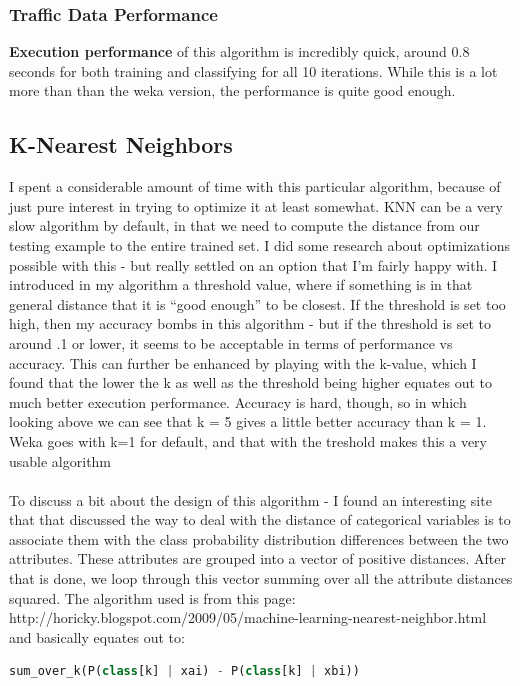 \documentclass{article}
\begin{document}
\subsubsection{Traffic Data Performance}
\textbf{Execution performance} of this algorithm is incredibly quick, around 0.8 seconds for both training and classifying for all 10 iterations.  While this is a lot more than than the weka version, the performance is quite good enough.\\
\subsection{K-Nearest Neighbors}
I spent a considerable amount of time with this particular algorithm, because of just pure interest in trying to optimize it at least somewhat.  KNN can be a very slow algorithm by default, in that we need to compute the distance from our testing example to the entire trained set.  I did some research about optimizations possible with this - but really settled on an option that I'm fairly happy with.  I introduced in my algorithm a threshold value, where if something is in that general distance that it is ``good enough'' to be closest.  If the threshold is set too high, then my accuracy bombs in this algorithm - but if the threshold is set to around .1 or lower, it seems to be acceptable in terms of performance vs accuracy.  This can further be enhanced by playing with the k-value, which I found that the lower the k as well as the threshold being higher equates out to much better execution performance.  Accuracy is hard, though, so in which looking above we can see that k = 5 gives a little better accuracy than k = 1.  Weka goes with k=1 for default, and that with the treshold makes this a very usable algorithm\\
\\
To discuss a bit about the design of this algorithm - I found an interesting site that that discussed the way to deal with the distance of categorical variables is to associate them with the class probability distribution differences between the two attributes.  These attributes are grouped into a vector of positive distances.  After that is done, we loop through this vector summing over all the attribute distances squared.  The algorithm used is from this page: http://horicky.blogspot.com/2009/05/machine-learning-nearest-neighbor.html and basically equates out to:
\begin{lstlisting}[frame=single,language=python]
sum_over_k(P(class[k] | xai) - P(class[k] | xbi))
\end{lstlisting}
\end{document}
